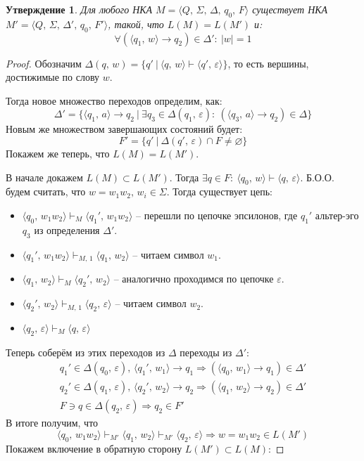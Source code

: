 \documentclass[a4paper,12pt]{article}
\renewcommand{\emptyset}{\ensuremath{\varnothing}}
\theoremstyle{plain}
\newtheorem{proposition}{Утверждение}[subsection]
\theoremstyle{definition}
\theoremstyle{remark}
\begin{document}
\begin{proposition}
	Для любого НКА $M = \langle Q,\,\Sigma,\, \Delta,\, q_0,\, F \rangle$ существует НКА $M' = \langle Q,\,\Sigma,\, \Delta',\, q_0,\, F' \rangle$, такой, что $L(M) = L(M')$ и:
	\[
		\forall (\langle q_1,\, w\rangle \to q_2) \in \Delta' :\: |w| = 1
	\]
\end{proposition}

\begin{proof}
	Обозначим $\Delta(q,\, w) = \{q' \:|\: \langle q,\, w\rangle \vdash \langle q',\, \varepsilon\rangle\}$, то есть вершины, достижимые по слову $w$.

	Тогда новое множество переходов определим, как:
	\[
		\Delta' = \{\langle q_1,\, a\rangle \to q_2 \:|\: \exists q_3 \in \Delta(q_1,\,\varepsilon) :\: (\langle q_3,\, a\rangle \to q_2) \in \Delta\}
	\]
	Новым же множеством завершающих состояний будет:
	\[
		F' = \{q' \:|\: \Delta(q',\, \varepsilon) \cap F \neq \emptyset\}
	\]
	Покажем же теперь, что $L(M) = L(M')$.

	В начале докажем $L(M) \subset L(M')$. Тогда $\exists q \in F :\: \langle q_0,\, w\rangle \vdash \langle q,\, \varepsilon\rangle$. Б.О.О. будем считать, что $w = w_1w_2,\, w_i \in \Sigma$. Тогда существует цепь:
	\begin{itemize}
		\item $\langle q_0,\, w_1w_2\rangle \vdash_M \langle q_1',\, w_1w_2\rangle$ -- перешли по цепочке эпсилонов, где $q_1'$ альтер-эго $q_3$ из определения $\Delta'$.
		\item $\langle q_1',\, w_1w_2\rangle \vdash_{M,\, 1} \langle q_1,\, w_2\rangle$ -- читаем символ $w_1$.
		\item $\langle q_1,\, w_2\rangle \vdash_M \langle q_2',\, w_2\rangle$ -- аналогично проходимся по цепочке $\varepsilon$.
		\item $\langle q_2',\, w_2\rangle \vdash_{M,\, 1} \langle q_2,\, \varepsilon\rangle$ -- читаем символ $w_2$.
		\item $\langle q_2,\, \varepsilon\rangle \vdash_M \langle q,\, \varepsilon\rangle$
	\end{itemize}
	Теперь соберём из этих переходов из $\Delta$ переходы из $\Delta'$:
	\begin{align*}
		q_1' \in \Delta(q_0,\, \varepsilon),\, \langle q_1',\, w_1\rangle \to q_1 \Rightarrow (\langle q_0,\, w_1\rangle \to q_1) \in \Delta' \\
		q_2' \in \Delta(q_1,\, \varepsilon),\, \langle q_2',\, w_2\rangle \to q_2 \Rightarrow (\langle q_1,\, w_2\rangle \to q_2) \in \Delta' \\
		F \ni q \in \Delta(q_2,\, \varepsilon) \Rightarrow q_2 \in F'
	\end{align*}
	В итоге получим, что
	\[
		\langle q_0,\, w_1w_2\rangle \vdash_{M'} \langle q_1,\, w_2\rangle \vdash_{M'} \langle q_2,\, \varepsilon\rangle \Rightarrow w = w_1w_2 \in L(M')
	\]
	Покажем включение в обратную сторону $L(M') \subset L(M)$:


\end{proof}
\end{document}
